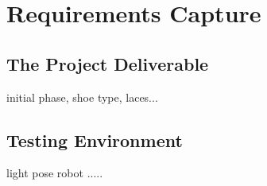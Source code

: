 \chapter{Requirements Capture}


\section{The Project Deliverable}
initial phase, shoe type, laces...

\section{Testing Environment}
light pose robot .....